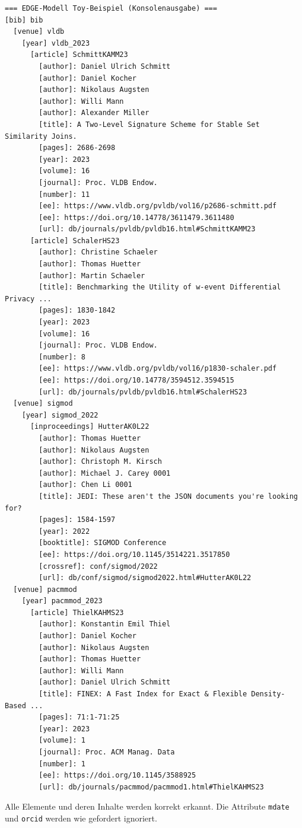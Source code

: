 \documentclass[11pt]{scrartcl}
\begin{document}
\begin{lstlisting}[style=dmrPython, frame=single]
=== EDGE-Modell Toy-Beispiel (Konsolenausgabe) ===
[bib] bib
  [venue] vldb
    [year] vldb_2023
      [article] SchmittKAMM23
        [author]: Daniel Ulrich Schmitt
        [author]: Daniel Kocher
        [author]: Nikolaus Augsten
        [author]: Willi Mann
        [author]: Alexander Miller
        [title]: A Two-Level Signature Scheme for Stable Set Similarity Joins.
        [pages]: 2686-2698
        [year]: 2023
        [volume]: 16
        [journal]: Proc. VLDB Endow.
        [number]: 11
        [ee]: https://www.vldb.org/pvldb/vol16/p2686-schmitt.pdf
        [ee]: https://doi.org/10.14778/3611479.3611480
        [url]: db/journals/pvldb/pvldb16.html#SchmittKAMM23
      [article] SchalerHS23
        [author]: Christine Schaeler
        [author]: Thomas Huetter
        [author]: Martin Schaeler
        [title]: Benchmarking the Utility of w-event Differential Privacy ...
        [pages]: 1830-1842
        [year]: 2023
        [volume]: 16
        [journal]: Proc. VLDB Endow.
        [number]: 8
        [ee]: https://www.vldb.org/pvldb/vol16/p1830-schaler.pdf
        [ee]: https://doi.org/10.14778/3594512.3594515
        [url]: db/journals/pvldb/pvldb16.html#SchalerHS23
  [venue] sigmod
    [year] sigmod_2022
      [inproceedings] HutterAK0L22
        [author]: Thomas Huetter
        [author]: Nikolaus Augsten
        [author]: Christoph M. Kirsch
        [author]: Michael J. Carey 0001
        [author]: Chen Li 0001
        [title]: JEDI: These aren't the JSON documents you're looking for?
        [pages]: 1584-1597
        [year]: 2022
        [booktitle]: SIGMOD Conference
        [ee]: https://doi.org/10.1145/3514221.3517850
        [crossref]: conf/sigmod/2022
        [url]: db/conf/sigmod/sigmod2022.html#HutterAK0L22
  [venue] pacmmod
    [year] pacmmod_2023
      [article] ThielKAHMS23
        [author]: Konstantin Emil Thiel
        [author]: Daniel Kocher
        [author]: Nikolaus Augsten
        [author]: Thomas Huetter
        [author]: Willi Mann
        [author]: Daniel Ulrich Schmitt
        [title]: FINEX: A Fast Index for Exact & Flexible Density-Based ...
        [pages]: 71:1-71:25
        [year]: 2023
        [volume]: 1
        [journal]: Proc. ACM Manag. Data
        [number]: 1
        [ee]: https://doi.org/10.1145/3588925
        [url]: db/journals/pacmmod/pacmmod1.html#ThielKAHMS23
\end{lstlisting}

Alle Elemente und deren Inhalte werden korrekt erkannt. Die Attribute \texttt{mdate} und \texttt{orcid}
werden wie gefordert ignoriert.
\end{document}
